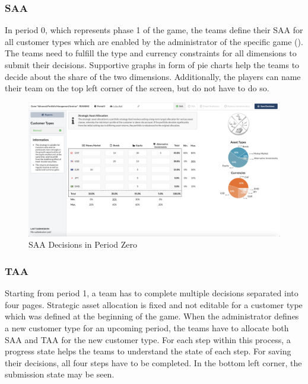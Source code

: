 \subsubsection{SAA}
In period 0, which represents phase 1 of the game, the teams define their SAA for all customer types which are enabled by the administrator of the specific game (). The teams need to fulfill the type and currency constraints for all dimensions to submit their decisions. Supportive graphs in form of pie charts help the teams to decide about the share of the two dimensions. Additionally, the players can name their team on the top left corner of the screen, but do not have to do so.
\begin{figure}[h!]
  \centering
  \includegraphics[scale=0.2]{img/application-overview/teams/02_period_zero_decisions.png}
  \caption{SAA Decisions in Period Zero}
  \label{fig:saa_decisions}
\end{figure}

\subsubsection{TAA}
Starting from period 1, a team has to complete multiple decisions separated into four pages. Strategic asset allocation is fixed and not editable for a customer type which was defined at the beginning of the game. When the administrator defines a new customer type for an upcoming period, the teams have to allocate both SAA and TAA for the new customer type. For each step within this process, a progress state helps the teams to understand the state of each step. For saving their decisions, all four steps have to be completed. In the bottom left corner, the submission state may be seen. \\

